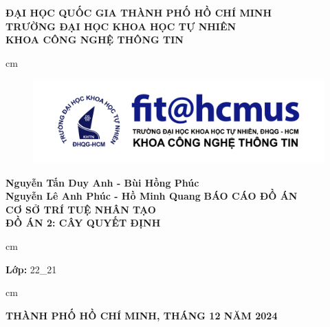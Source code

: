 \begin{titlepage}
	\begin{mybox}
		\begin{center}
			\fontsize{12}{12}\selectfont
			\textbf{ĐẠI HỌC QUỐC GIA THÀNH PHỐ HỒ CHÍ MINH}\\
			\textbf{TRƯỜNG ĐẠI HỌC KHOA HỌC TỰ NHIÊN}\\
			\textbf{KHOA CÔNG NGHỆ THÔNG TIN}
		\end{center}
		 cm
		\begin{figure}[H]
			\begin{center}
				\includegraphics[scale=0.5]{figures/fit-logo-chuan-V3}
				\label{fig:fit-logo}
			\end{center}
		\end{figure}
		\begin{center}
			\fontsize{16}{12}\selectfont
			\textbf{Nguyễn Tấn Duy Anh - Bùi Hồng Phúc\\ Nguyễn Lê Anh Phúc - Hồ Minh Quang}
			\vskip 1.75cm
			\textbf{BÁO CÁO ĐỒ ÁN}\\
			\fontsize{24}{20}\selectfont
			\textbf{CƠ SỞ TRÍ TUỆ NHÂN TẠO}\\
			\fontsize{16}{12}\selectfont
			\textbf{ĐỒ ÁN 2: CÂY QUYẾT ĐỊNH}
		\end{center}
		 cm
		\fontsize{14}{12}\selectfont
		\begin{center}
			\textbf{Lớp:} 22\_21
		\end{center}
		 cm
		\begin{center}
			\textbf{THÀNH PHỐ HỒ CHÍ MINH, THÁNG 12 NĂM 2024}
		\end{center}
	\end{mybox}
	
	\pagebreak
	\thispagestyle{empty}
	

\end{titlepage}
